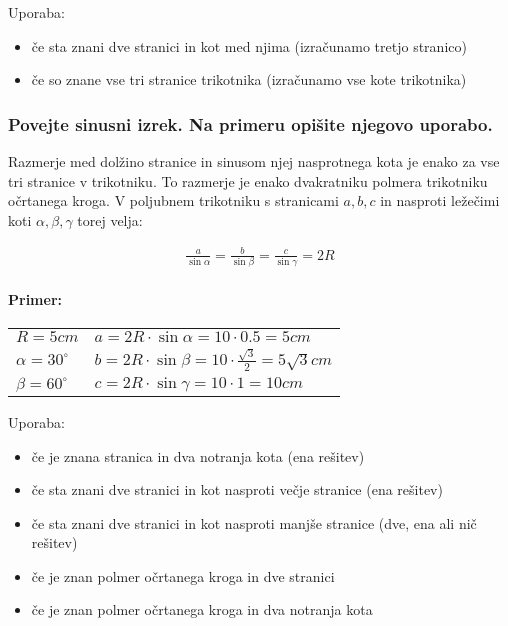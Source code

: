 \documentclass{article}
\begin{document}
Uporaba:

\begin{itemize}
  \item če sta znani dve stranici in kot med njima (izračunamo tretjo stranico)
  \item če so znane vse tri stranice trikotnika (izračunamo vse kote trikotnika)
\end{itemize}


\subsubsection*{Povejte sinusni izrek. Na primeru opišite njegovo uporabo.}

Razmerje med dolžino stranice in sinusom njej nasprotnega kota je enako za vse tri stranice v trikotniku. To razmerje je enako dvakratniku polmera trikotniku očrtanega kroga. V poljubnem trikotniku s stranicami $a, b, c$ in nasproti ležečimi koti $\alpha, \beta, \gamma$ torej velja:

$$
\begin{aligned}
\frac{a}{\sin\alpha} = \frac{b}{\sin\beta} = \frac{c}{\sin\gamma} = 2R
\end{aligned}
$$

\paragraph{Primer:}

\begin{center}

\begin{tabular}{ p{5
cm} l }
     $R = 5 cm$ &  $a = 2R \cdot \sin{\alpha} = 10 \cdot 0.5 = 5 cm$\\
     $\alpha = 30^\circ$ & $b = 2R \cdot \sin{\beta} = 10 \cdot \frac{\sqrt{3}}{2} = 5\sqrt{3} cm$ \\
     $\beta = 60^\circ$ & $c = 2R \cdot \sin{\gamma} = 10 \cdot 1 = 10 cm$     
\end{tabular}
    
\end{center}
Uporaba:

\begin{itemize}
  \item če je znana stranica in dva notranja kota (ena rešitev)
  \item če sta znani dve stranici in kot nasproti večje stranice (ena rešitev)
  \item če sta znani dve stranici in kot nasproti manjše stranice (dve, ena ali nič rešitev)
  \item če je znan polmer očrtanega kroga in dve stranici
  \item če je znan polmer očrtanega kroga in dva notranja kota
\end{itemize}
\end{document}
